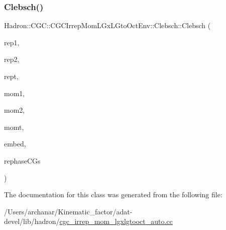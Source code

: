 \mbox{\label{classHadron_1_1CGC_1_1CGCIrrepMomLGxLGtoOctEnv_1_1Clebsch_ad45db603e49894fc27cb00dd494fb286}} 
\subsubsection{\texorpdfstring{Clebsch()}{Clebsch()}\hspace{0.1cm}{\footnotesize\ttfamily [4/4]}}
{\footnotesize\ttfamily Hadron\+::\+C\+G\+C\+::\+C\+G\+C\+Irrep\+Mom\+L\+Gx\+L\+Gto\+Oct\+Env\+::\+Clebsch\+::\+Clebsch (\begin{DoxyParamCaption}\item[{const std\+::string \&}]{rep1,  }\item[{const std\+::string \&}]{rep2,  }\item[{const std\+::string \&}]{rept,  }\item[{const Array\+Int \&}]{mom1,  }\item[{const Array\+Int \&}]{mom2,  }\item[{const Array\+Int \&}]{momt,  }\item[{int}]{embed,  }\item[{bool}]{rephase\+C\+Gs }\end{DoxyParamCaption})\hspace{0.3cm}{\ttfamily [inline]}}



The documentation for this class was generated from the following file\+:\begin{DoxyCompactItemize}
\item 
/\+Users/archanar/\+Kinematic\+\_\+factor/adat-\/devel/lib/hadron/\mbox{\hyperlink{adat-devel_2lib_2hadron_2cgc__irrep__mom__lgxlgtooct__auto_8cc}{cgc\+\_\+irrep\+\_\+mom\+\_\+lgxlgtooct\+\_\+auto.\+cc}}\end{DoxyCompactItemize}
